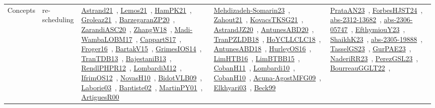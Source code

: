 {\begin{longtable}{lp{3cm}>{\raggedright\arraybackslash}p{6cm}>{\raggedright\arraybackslash}p{6cm}>{\raggedright\arraybackslash}p{8cm}}
Concepts & re-scheduling & \href{works/Astrand21.pdf}{Astrand21}~\cite{Astrand21}, \href{works/Lemos21.pdf}{Lemos21}~\cite{Lemos21}, \href{works/HamPK21.pdf}{HamPK21}~\cite{HamPK21}, \href{works/Groleaz21.pdf}{Groleaz21}~\cite{Groleaz21}, \href{works/BarzegaranZP20.pdf}{BarzegaranZP20}~\cite{BarzegaranZP20}, \href{works/ZarandiASC20.pdf}{ZarandiASC20}~\cite{ZarandiASC20}, \href{works/ZhangW18.pdf}{ZhangW18}~\cite{ZhangW18}, \href{works/Madi-WambaLOBM17.pdf}{Madi-WambaLOBM17}~\cite{Madi-WambaLOBM17}, \href{works/CappartS17.pdf}{CappartS17}~\cite{CappartS17}, \href{works/Froger16.pdf}{Froger16}~\cite{Froger16}, \href{works/BartakV15.pdf}{BartakV15}~\cite{BartakV15}, \href{works/GrimesIOS14.pdf}{GrimesIOS14}~\cite{GrimesIOS14}, \href{works/TranTDB13.pdf}{TranTDB13}~\cite{TranTDB13}, \href{works/BajestaniB13.pdf}{BajestaniB13}~\cite{BajestaniB13}, \href{works/RendlPHPR12.pdf}{RendlPHPR12}~\cite{RendlPHPR12}, \href{works/LombardiM12.pdf}{LombardiM12}~\cite{LombardiM12}, \href{works/IfrimOS12.pdf}{IfrimOS12}~\cite{IfrimOS12}, \href{works/NovasH10.pdf}{NovasH10}~\cite{NovasH10}, \href{works/BidotVLB09.pdf}{BidotVLB09}~\cite{BidotVLB09}, \href{works/Laborie03.pdf}{Laborie03}~\cite{Laborie03}, \href{works/Baptiste02.pdf}{Baptiste02}~\cite{Baptiste02}, \href{works/MartinPY01.pdf}{MartinPY01}~\cite{MartinPY01}, \href{works/ArtiguesR00.pdf}{ArtiguesR00}~\cite{ArtiguesR00} & \href{works/Mehdizadeh-Somarin23.pdf}{Mehdizadeh-Somarin23}~\cite{Mehdizadeh-Somarin23}, \href{works/Zahout21.pdf}{Zahout21}~\cite{Zahout21}, \href{works/KovacsTKSG21.pdf}{KovacsTKSG21}~\cite{KovacsTKSG21}, \href{works/AstrandJZ20.pdf}{AstrandJZ20}~\cite{AstrandJZ20}, \href{works/AntunesABD20.pdf}{AntunesABD20}~\cite{AntunesABD20}, \href{works/TranPZLDB18.pdf}{TranPZLDB18}~\cite{TranPZLDB18}, \href{works/HoYCLLCLC18.pdf}{HoYCLLCLC18}~\cite{HoYCLLCLC18}, \href{works/AntunesABD18.pdf}{AntunesABD18}~\cite{AntunesABD18}, \href{works/HurleyOS16.pdf}{HurleyOS16}~\cite{HurleyOS16}, \href{works/LimHTB16.pdf}{LimHTB16}~\cite{LimHTB16}, \href{works/LimBTBB15.pdf}{LimBTBB15}~\cite{LimBTBB15}, \href{works/CobanH11.pdf}{CobanH11}~\cite{CobanH11}, \href{works/Lombardi10.pdf}{Lombardi10}~\cite{Lombardi10}, \href{works/CobanH10.pdf}{CobanH10}~\cite{CobanH10}, \href{works/Acuna-AgostMFG09.pdf}{Acuna-AgostMFG09}~\cite{Acuna-AgostMFG09}, \href{works/Elkhyari03.pdf}{Elkhyari03}~\cite{Elkhyari03}, \href{works/Beck99.pdf}{Beck99}~\cite{Beck99} & \href{works/PrataAN23.pdf}{PrataAN23}~\cite{PrataAN23}, \href{works/ForbesHJST24.pdf}{ForbesHJST24}~\cite{ForbesHJST24}, \href{works/abs-2312-13682.pdf}{abs-2312-13682}~\cite{abs-2312-13682}, \href{works/abs-2306-05747.pdf}{abs-2306-05747}~\cite{abs-2306-05747}, \href{works/EfthymiouY23.pdf}{EfthymiouY23}~\cite{EfthymiouY23}, \href{works/ShaikhK23.pdf}{ShaikhK23}~\cite{ShaikhK23}, \href{works/abs-2305-19888.pdf}{abs-2305-19888}~\cite{abs-2305-19888}, \href{works/TasselGS23.pdf}{TasselGS23}~\cite{TasselGS23}, \href{works/GurPAE23.pdf}{GurPAE23}~\cite{GurPAE23}, \href{works/NaderiRR23.pdf}{NaderiRR23}~\cite{NaderiRR23}, \href{works/PerezGSL23.pdf}{PerezGSL23}~\cite{PerezGSL23}, \href{works/BourreauGGLT22.pdf}{BourreauGGLT22}~\cite{BourreauGGLT22}, 
\end{longtable}}
